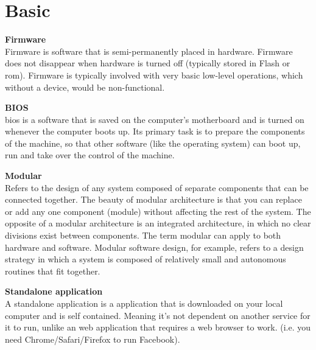 \section{Basic}
\textbf{Firmware \\}
Firmware is software that is semi-permanently placed in hardware. Firmware does not disappear when 
hardware is turned off (typically stored in Flash or \acrshort{rom}). 
Firmware is typically involved with very basic low-level operations, which without a device, would be
non-functional.  

\textbf{BIOS} \\
\acrfull{bios} is a software that is saved on the computer's motherboard
and is turned on whenever the computer boots up. Its primary task is to prepare the components of the machine, so that other software (like the operating system) can boot up, run and take over the control of the machine.  

\textbf{Modular} \\
Refers to the design of any system composed of separate components that can be connected together. The beauty of modular architecture is that you can replace or add any one component (module) without affecting the rest of the system. The opposite of a modular architecture is an integrated architecture, in which no clear divisions exist between components. The term modular can apply to both hardware and software. Modular software design, for example, refers to a design strategy in which a system is composed of relatively small and autonomous routines that fit together. 

\textbf{Standalone application} \\
A standalone application is a application that is downloaded on your local computer and is self contained. Meaning it's not dependent on another service for it to run, unlike an web application that requires a web browser to work. (i.e. you need Chrome/Safari/Firefox to run Facebook). 

\newpage
    

